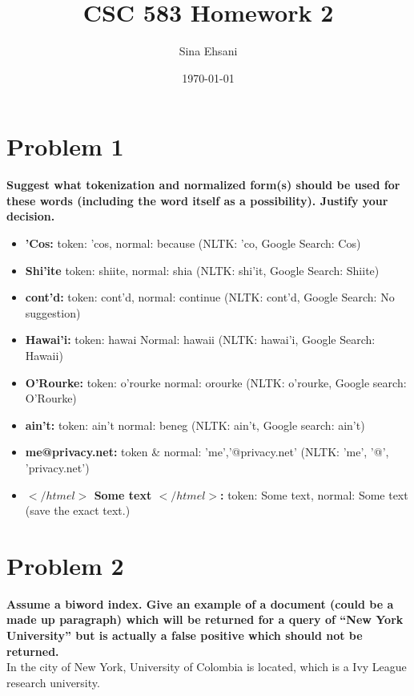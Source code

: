 \documentclass{article}
\title{CSC 583 Homework 2}
\author{Sina Ehsani}
\date{\today}
\begin{document}
\maketitle


\section{Problem 1}



\textbf{Suggest what tokenization and normalized form(s) should be used for these words (including the word itself as a possibility). Justify your decision.}

\begin{itemize}
\item \textbf{’Cos:} \quad token: 'cos, normal: because (NLTK: 'co, Google Search: Cos)
\item \textbf{Shi’ite} \quad token: shiite, normal: shia (NLTK: shi'it, Google Search: Shiite)
\item \textbf{cont’d:} \quad token: cont'd, normal: continue (NLTK: cont’d, Google Search: No suggestion)
\item \textbf{Hawai’i:} \quad token: hawai Normal: hawaii (NLTK: hawai’i, Google Search: Hawaii)
\item \textbf{O’Rourke:} \quad token: o'rourke normal: orourke (NLTK: o’rourke, Google search: O’Rourke)
\item \textbf{ain’t:} \quad token: ain't normal: beneg (NLTK: ain’t, Google search: ain’t) 
\item \textbf{me@privacy.net:} \quad token \& normal: 'me','@privacy.net' (NLTK: 'me', '@', 'privacy.net')
\item \textbf{$</htmel>$ Some text $</htmel>$:} \quad token: Some text, normal: Some text (save the exact text.)
\end{itemize}



\section{Problem 2}
\textbf{Assume a biword index. Give an example of a document (could be a made up paragraph) which will be returned for a query of “New York University” but is actually a false positive which should not be returned.}
\\

In the city of New York, University of Colombia is located, which is a Ivy League research university.
\end{document}
